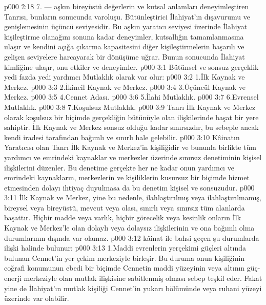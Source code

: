 \vs p000 2:18 7. --- aşkın bireyüstü değerlerin ve kutsal anlamları deneyimleştiren Tanrısı, bunların sonucunda varoluşu. Bütünleştirici İlahiyat’ın dışavurumu ve genişlemesinin üçüncü seviyesidir. Bu aşkın yaratıcı seviyesi üzerinde İlahiyat kişileştirme olanağını sonuna kadar deneyimler, kutsallığın tamamlanmasına ulaşır ve kendini açığa çıkarma kapasitesini diğer kişileştirmelerin başarılı ve gelişen seviyelere harcayarak bir dönüşüme uğrar. Bunun sonucunda İlahiyat  kimliğine ulaşır, onu etkiler ve deneyimler.
\vs p000 3:1 Bütünsel ve sonsuz gerçeklik yedi fazda yedi yardımcı Mutlaklık olarak var olur:
\vs p000 3:2 1.\bibnobreakspace İlk Kaynak ve Merkez.
\vs p000 3:3 2.\bibnobreakspace İkincil Kaynak ve Merkez.
\vs p000 3:4 3.\bibnobreakspace Üçüncül Kaynak ve Merkez.
\vs p000 3:5 4.\bibnobreakspace Cennet Adası.
\vs p000 3:6 5.\bibnobreakspace İlahi Mutlaklık.
\vs p000 3:7 6.\bibnobreakspace Evrensel Mutlaklık.
\vs p000 3:8 7.\bibnobreakspace Koşulsuz Mutlaklık.
\vs p000 3:9 Tanrı İlk Kaynak ve Merkez olarak koşulsuz bir biçimde gerçekliğin bütünüyle olan ilişkilerinde başat bir yere sahiptir. İlk Kaynak ve Merkez sonsuz olduğu kadar sınırsızdır, bu sebeple ancak kendi iradesi tarafından bağımlı ve sınırlı hale gelebilir.
\vs p000 3:10 Kâinatın Yaratıcısı olan Tanrı İlk Kaynak ve Merkez’in kişiliğidir ve bununla birlikte tüm yardımcı ve emrindeki kaynaklar ve merkezler üzerinde sınırsız denetiminin kişisel ilişkilerini düzenler. Bu denetime gerçekte her ne kadar onun yardımcı ve emrindeki kaynakların, merkezlerin ve kişiliklerin kusursuz bir biçimde hizmet etmesinden dolayı ihtiyaç duyulmasa da bu denetim  kişisel ve sonsuzudur.
\vs p000 3:11 İlk Kaynak ve Merkez, yine bu nedenle, ilahlaştırılmış veya ilahlaştırılmamış, bireysel veya bireyüstü, mevcut veya olası, sınırlı veya sınırsız tüm alanlarda başattır. Hiçbir madde veya varlık, hiçbir görecelik veya kesinlik onların İlk Kaynak ve Merkez’le olan dolaylı veya dolaysız ilişkilerinin ve ona bağımlı olma durumlarının dışında var olamaz.
\vs p000 3:12  kâinat ile bahsi geçen şu durumlarda ilişki halinde bulunur:
\vs p000 3:13 1.\bibnobreakspace Maddi evrenlerin yerçekimi güçleri altında bulunan Cennet’in yer çekim merkeziyle birleşir. Bu duruma onun kişiliğinin coğrafi konumunun ebedi bir biçimde Cennetin maddi yüzeyinin veya altının güç\hyp{}enerji merkeziyle olan mutlak ilişkisine sabitlenmiş olması sebep teşkil eder. Fakat yine de İlahiyat’ın mutlak kişiliği Cennet’in yukarı bölümünde veya ruhani yüzeyi üzerinde var olabilir.

